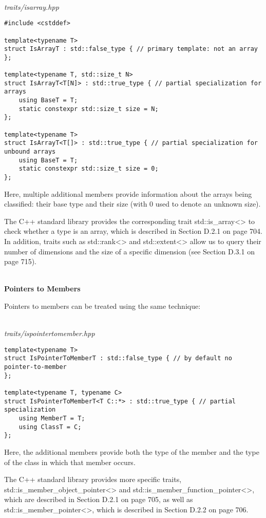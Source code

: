 \hspace*{\fill} \\ %
\noindent
\textit{traits/isarray.hpp}
\begin{lstlisting}[style=styleCXX]
#include <cstddef>

template<typename T>
struct IsArrayT : std::false_type { // primary template: not an array
};

template<typename T, std::size_t N>
struct IsArrayT<T[N]> : std::true_type { // partial specialization for arrays
	using BaseT = T;
	static constexpr std::size_t size = N;
};

template<typename T>
struct IsArrayT<T[]> : std::true_type { // partial specialization for unbound arrays
	using BaseT = T;
	static constexpr std::size_t size = 0;
};
\end{lstlisting}

Here, multiple additional members provide information about the arrays being classified: their base type and their size (with 0 used to denote an unknown size).

The C++ standard library provides the corresponding trait std::is\_array<> to check whether a type is an array, which is described in Section D.2.1 on page 704. In addition, traits such as std::rank<> and std::extent<> allow us to query their number of dimensions and the size of a specific dimension (see Section D.3.1 on page 715).

\hspace*{\fill} \\ %
\noindent
\textbf{Pointers to Members}

Pointers to members can be treated using the same technique:

\hspace*{\fill} \\ %
\noindent
\textit{traits/ispointertomember.hpp}
\begin{lstlisting}[style=styleCXX]
template<typename T>
struct IsPointerToMemberT : std::false_type { // by default no pointer-to-member
};

template<typename T, typename C>
struct IsPointerToMemberT<T C::*> : std::true_type { // partial specialization
	using MemberT = T;
	using ClassT = C;
};
\end{lstlisting}

Here, the additional members provide both the type of the member and the type of the class in which that member occurs.

The C++ standard library provides more specific traits, std::is\_member\_object\_pointer<> and std::is\_member\_function\_pointer<>, which are described in Section D.2.1 on page 705, as well as std::is\_member\_pointer<>, which is described in Section D.2.2 on page 706.

